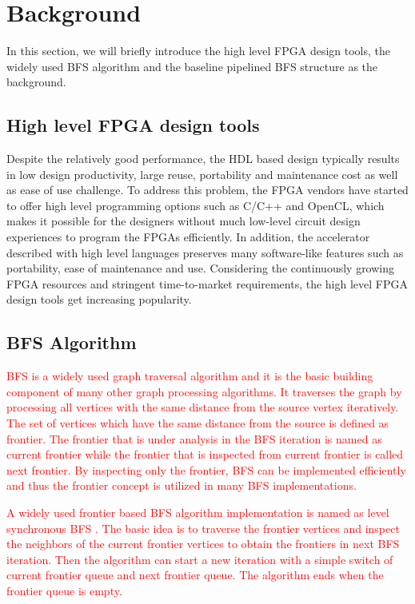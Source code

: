 \section{Background} \label{sec:background}
In this section, we will briefly introduce the high level FPGA design tools,
the widely used BFS algorithm and the baseline pipelined BFS structure 
as the background.

\subsection{High level FPGA design tools}
Despite the relatively good performance, 
the HDL based design typically results in low design productivity, large reuse, 
portability and maintenance cost as well as ease of use challenge. 
To address this problem, the FPGA vendors have started 
to offer high level programming options such as C/C++ and OpenCL, which makes 
it possible for the designers without much low-level circuit design 
experiences \cite{nimbix, xilinx-sdaccel, intel-opencl} 
to program the FPGAs efficiently. In addition, the accelerator 
described with high level languages preserves many software-like features 
such as portability, ease of maintenance and use. Considering the  
continuously growing FPGA resources and stringent time-to-market requirements, 
the high level FPGA design tools \cite{Nane2016hls-survey} get increasing popularity.

\subsection{BFS Algorithm}
\textcolor{red}{BFS is a widely used graph traversal algorithm and it is the basic 
building component of many other graph processing algorithms. 
It traverses the graph by processing all vertices with the same distance from the 
source vertex iteratively. The set of vertices which have the same distance from the 
source is defined as frontier. The frontier that is under analysis in the BFS iteration 
is named as current frontier while the frontier that is inspected from current frontier 
is called next frontier. By inspecting only the frontier, BFS can be implemented efficiently 
and thus the frontier concept is utilized in many BFS implementations.}


\textcolor{red}{
A widely used frontier based BFS algorithm implementation is named as 
level synchronous BFS \cite{attia2014cygraph, betkaoui2012reconfigurable, 
zhang2017boosting}. The basic idea is to traverse the frontier vertices 
and inspect the neighbors of the current frontier vertices to obtain the 
frontiers in next BFS iteration. Then the algorithm can start a new 
iteration with a simple switch of current frontier queue and next frontier queue. 
The algorithm ends when the frontier queue is empty.}

